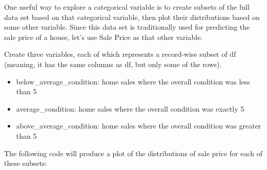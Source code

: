 \documentclass[
]{article}
\newenvironment{Shaded}{\begin{snugshade}}{\end{snugshade}}
\newcommand{\DecValTok}[1]{\textcolor[rgb]{0.00,0.00,0.81}{#1}}
\newcommand{\NormalTok}[1]{#1}
\newcommand{\OtherTok}[1]{\textcolor[rgb]{0.56,0.35,0.01}{#1}}
\newcommand{\SpecialCharTok}[1]{\textcolor[rgb]{0.81,0.36,0.00}{\textbf{#1}}}
\begin{document}
One useful way to explore a categorical variable is to create subsets of
the full data set based on that categorical variable, then plot their
distributions based on some other variable. Since this data set is
traditionally used for predicting the sale price of a house, let's use
Sale Price as that other variable.

Create three variables, each of which represents a record-wise subset of
df (meaning, it has the same columns as df, but only some of the rows).

\begin{itemize}
\item
  below\_average\_condition: home sales where the overall condition was
  less than 5
\item
  average\_condition: home sales where the overall condition was exactly
  5
\item
  above\_average\_condition: home sales where the overall condition was
  greater than 5
\end{itemize}

\begin{Shaded}
\end{Shaded}

The following code will produce a plot of the distributions of sale
price for each of these subsets:
\end{document}
